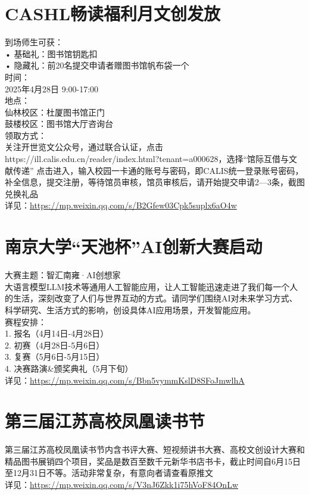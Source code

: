 \documentclass[letterpaper, 12pt]{article}
\begin{document}
\begin{multicols}{2}
\section{CASHL畅读福利月文创发放} %
到场师生可获：
\\• 基础礼：图书馆钥匙扣
\\• 隐藏礼：前20名提交申请者赠图书馆帆布袋一个
\\时间：
\\2025年4月28日 9:00-17:00
\\地点：
\\仙林校区：杜厦图书馆正门
\\鼓楼校区：图书馆大厅咨询台
\\领取方式：
\\关注开世览文公众号，通过联合认证，点击https://ill.calis.edu.cn/reader/index.html?tenant=a000628，选择“馆际互借与文献传递” 点击进入，输入校园一卡通的账号与密码，即CALIS统一登录账号密码，补全信息，提交注册，等待馆员审核，馆员审核后，请开始提交申请2—3条，截图兑换礼品
\\详见：\url{https://mp.weixin.qq.com/s/B2Gfew03Cpk5suplx6aO4w}
\section{南京大学“天池杯”AI创新大赛启动} %
大赛主题：智汇南雍·AI创想家
\\大语言模型LLM技术等通用人工智能应用，让人工智能迅速走进了我们每一个人的生活，深刻改变了人们与世界互动的方式。请同学们围绕AI对未来学习方式、科学研究、生活方式的影响，创设具体AI应用场景，开发智能应用。
\\赛程安排：
\\1. 报名（4月14日-4月28日）
\\2. 初赛（4月28日-5月6日）
\\3. 复赛（5月6日-5月15日）
\\4. 决赛路演\&颁奖典礼（5月下旬）
\\详见：\url{https://mp.weixin.qq.com/s/Bbn5vymmKslD8SFoJmwlhA}



\section{第三届江苏高校凤凰读书节} %
第三届江苏高校凤凰读书节内含书评大赛、短视频讲书大赛、高校文创设计大赛和精品图书展销四个项目，奖品是数百至数千元新华书店书卡，截止时间自6月15日至12月31日不等。活动非常复杂，有意向者请查看原推文
\\详见：\url{https://mp.weixin.qq.com/s/V3nJ6Zkk1i75hVoF84OnLw}


\end{multicols}
\end{document}
